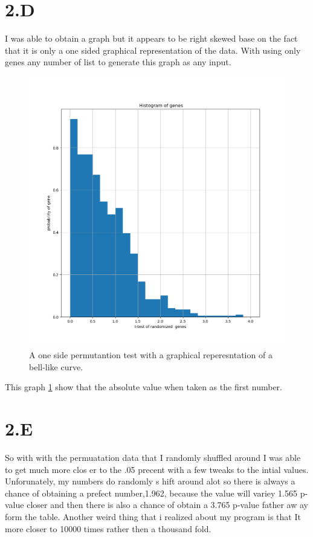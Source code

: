\documentclass[12pt]{article}
\begin{document}
  \part{2.D}
                  I was able to obtain a graph but it appears to be right skewed base on the fact that it is only a one sided graphical representation of the data. With using only genes any number of list to generate this graph  as any input.
                  \begin{figure}
                  \includegraphics[width=\linewidth]{./Figure1.png}
                  \caption{A one side permutantion test with a graphical reperesntation of a bell-like     curve.}
                  \label{fig:graph1}
                  \end{figure}
                   This graph \ref{fig:graph1} show that the absolute value when taken as the first number.
\part{2.E}
   So with with the permuatation data that I randomly shuffled around I was able to get much more clos    er to the .05 precent with a few tweaks to the intial values. Unforunately, my numbers do randomly s    hift around alot so there is always a chance of obtaining a prefect number,1.962, because the value     will variey 1.565 p-value closer and then there is also a chance of obtain a 3.765 p-value father aw    ay form the table. Another weird thing that i realized about my program is that It more closer to 10000 times rather then a thousand fold.
\end{document}
